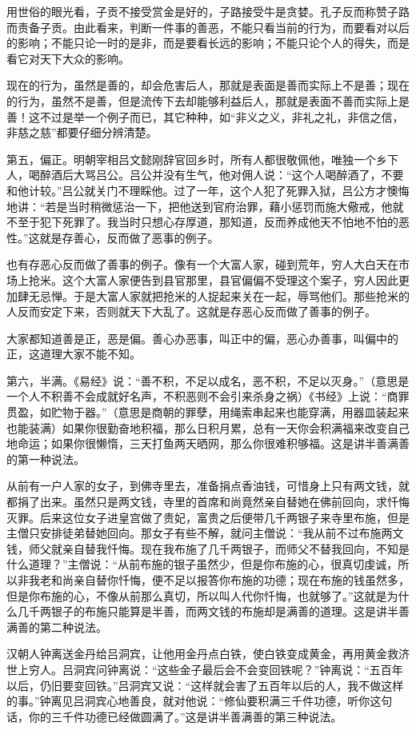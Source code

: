 \documentclass[12pt,UTF8]{ctexbook}
\begin{document}
用世俗的眼光看，子贡不接受赏金是好的，子路接受牛是贪婪。孔子反而称赞子路而责备子贡。由此看来，判断一件事的善恶，不能只看当前的行为，而要看对以后的影响；不能只论一时的是非，而是要看长远的影响；不能只论个人的得失，而是看它对天下大众的影响。

现在的行为，虽然是善的，却会危害后人，那就是表面是善而实际上不是善；现在的行为，虽然不是善，但是流传下去却能够利益后人，那就是表面不善而实际上是善！这不过是举一个例子而已，其它种种，如“非义之义，非礼之礼，非信之信，非慈之慈”都要仔细分辨清楚。

第五，偏正。明朝宰相吕文懿刚辞官回乡时，所有人都很敬佩他，唯独一个乡下人，喝醉酒后大骂吕公。吕公并没有生气，他对佣人说：“这个人喝醉酒了，不要和他计较。”吕公就关门不理睬他。过了一年，这个人犯了死罪入狱，吕公方才懊悔地讲：“若是当时稍微惩治一下，把他送到官府治罪，藉小惩罚而施大儆戒，他就不至于犯下死罪了。我当时只想心存厚道，那知道，反而养成他天不怕地不怕的恶性。”这就是存善心，反而做了恶事的例子。

也有存恶心反而做了善事的例子。像有一个大富人家，碰到荒年，穷人大白天在市场上抢米。这个大富人家便告到县官那里，县官偏偏不受理这个案子，穷人因此更加肆无忌惮。于是大富人家就把抢米的人捉起来关在一起，辱骂他们。那些抢米的人反而安定下来，否则就天下大乱了。这就是存恶心反而做了善事的例子。

大家都知道善是正，恶是偏。善心办恶事，叫正中的偏，恶心办善事，叫偏中的正，这道理大家不能不知。

第六，半满。《易经》说：“善不积，不足以成名，恶不积，不足以灭身。”（意思是一个人不积善不会成就好名声，不积恶则不会引来杀身之祸）《书经》上说：“商罪贯盈，如贮物于器。”（意思是商朝的罪孽，用绳索串起来也能穿满，用器皿装起来也能装满）如果你很勤奋地积福，那么日积月累，总有一天你会积满福来改变自己地命运；如果你很懒惰，三天打鱼两天晒网，那么你很难积够福。这是讲半善满善的第一种说法。

从前有一户人家的女子，到佛寺里去，准备捐点香油钱，可惜身上只有两文钱，就都捐了出来。虽然只是两文钱，寺里的首席和尚竟然亲自替她在佛前回向，求忏悔灭罪。后来这位女子进皇宫做了贵妃，富贵之后便带几千两银子来寺里布施，但是主僧只安排徒弟替她回向。那女子有些不解，就问主僧说：“我从前不过布施两文钱，师父就亲自替我忏悔。现在我布施了几千两银子，而师父不替我回向，不知是什么道理？”主僧说：“从前布施的银子虽然少，但是你布施的心，很真切虔诚，所以非我老和尚亲自替你忏悔，便不足以报答你布施的功德；现在布施的钱虽然多，但是你布施的心，不像从前那么真切，所以叫人代你忏悔，也就够了。”这就是为什么几千两银子的布施只能算是半善，而两文钱的布施却是满善的道理。这是讲半善满善的第二种说法。

汉朝人钟离送金丹给吕洞宾，让他用金丹点白铁，使白铁变成黄金，再用黄金救济世上穷人。吕洞宾问钟离说：“这些金子最后会不会变回铁呢？”钟离说：“五百年以后，仍旧要变回铁。”吕洞宾又说：“这样就会害了五百年以后的人，我不做这样的事。”钟离见吕洞宾心地善良，就对他说：“修仙要积满三千件功德，听你这句话，你的三千件功德已经做圆满了。”这是讲半善满善的第三种说法。
\end{document}

